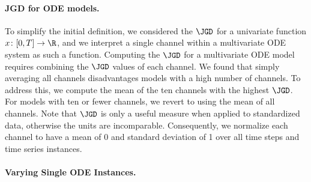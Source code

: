 \paragraph{JGD for ODE models.}\label{sec:jdg-ode-models}

To simplify the initial definition, we considered the $\JGD$ for a univariate function
${x\colon [0,T] \to \R}$, and we interpret a single channel within a multivariate ODE system as such a function.
Computing the $\JGD$ for a multivariate ODE model requires combining the $\JGD$ values of each channel.
We found that simply averaging all channels disadvantages models with a high number of channels.
To address this, we compute the mean of the ten channels with the highest $\JGD$\@.
For models with ten or fewer channels, we revert to using the mean of all channels.
Note that $\JGD$ is only a useful measure when applied to standardized data, otherwise the units are incomparable.
Consequently, we normalize each channel to have a mean of 0 and standard deviation of 1 over all
time steps and time series instances.

\paragraph{Varying Single ODE Instances.}\label{sec:pointwise-gradient-deviation}

